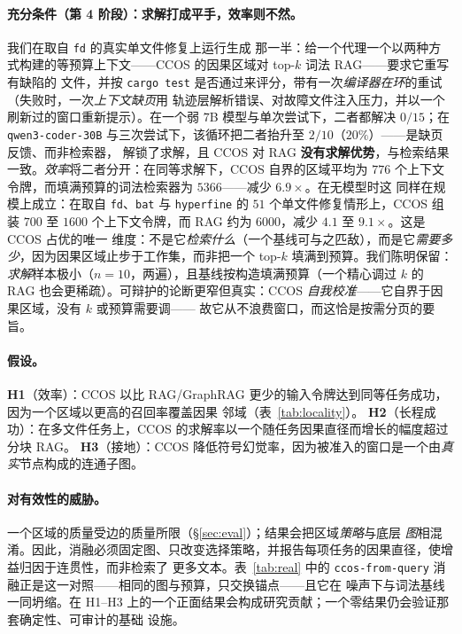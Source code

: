 \documentclass[11pt]{ctexart}
\newcommand{\code}[1]{\texttt{#1}}
\begin{document}
\paragraph{充分条件（第 4 阶段）：求解打成平手，效率则不然。} 我们在取自 \code{fd} 的真实单文件修复上运行生成
那一半：给一个代理一个以两种方式构建的等预算上下文——CCOS 的因果区域对 top-$k$ 词法 RAG——要求它重写有缺陷的
文件，并按 \code{cargo test} 是否通过来评分，带有一次\emph{编译器在环}的重试（失败时，一次\emph{上下文缺页}用
轨迹层解析错误、对故障文件注入压力，并以一个刷新过的窗口重新提示）。在一个弱 $7$B 模型与单次尝试下，二者都解决
$0/15$；在 \code{qwen3-coder-30B} 与三次尝试下，该循环把二者抬升至 $2/10$（$20\%$）——是缺页反馈、而非检索器，
解锁了求解，且 CCOS 对 RAG \textbf{没有求解优势}，与检索结果一致。\emph{效率}将二者分开：在同等求解下，CCOS
自界的区域平均为 $776$ 个上下文令牌，而填满预算的词法检索器为 $5366$——减少 $\mathbf{6.9\times}$。在无模型时这
同样在规模上成立：在取自 \code{fd}、\code{bat} 与 \code{hyperfine} 的 $51$ 个单文件修复情形上，CCOS 组装 $700$
至 $1600$ 个上下文令牌，而 RAG 约为 $6000$，减少 $\mathbf{4.1}$ 至 $\mathbf{9.1\times}$。这是 CCOS 占优的唯一
维度：不是它\emph{检索什么}（一个基线可与之匹敌），而是它\emph{需要多少}，因为因果区域止步于工作集，而非把一个
top-$k$ 填满到预算。我们陈明保留：\emph{求解}样本极小（$n{=}10$，两遍），且基线按构造填满预算（一个精心调过 $k$
的 RAG 也会更稀疏）。可辩护的论断更窄但真实：CCOS \emph{自我校准}——它自界于因果区域，没有 $k$ 或预算需要调——
故它从不浪费窗口，而这恰是按需分页的要旨。

\paragraph{假设。}
\textbf{H1}（效率）：CCOS 以比 RAG/GraphRAG 更少的输入令牌达到同等任务成功，因为一个区域以更高的召回率覆盖因果
邻域（表~\ref{tab:locality}）。
\textbf{H2}（长程成功）：在多文件任务上，CCOS 的求解率以一个随任务因果直径而增长的幅度超过分块 RAG。
\textbf{H3}（接地）：CCOS 降低符号幻觉率，因为被准入的窗口是一个由\emph{真实}节点构成的连通子图。

\paragraph{对有效性的威胁。} 一个区域的质量受边的质量所限（\S\ref{sec:eval}）；结果会把区域\emph{策略}与底层
\emph{图}相混淆。因此，消融必须固定图、只改变选择策略，并报告每项任务的因果直径，使增益归因于连贯性，而非检索了
更多文本。表~\ref{tab:real} 中的 \code{ccos-from-query} 消融正是这一对照——相同的图与预算，只交换锚点——且它在
噪声下与词法基线一同坍缩。在 H1--H3 上的一个正面结果会构成研究贡献；一个零结果仍会验证那套确定性、可审计的基础
设施。
\end{document}

